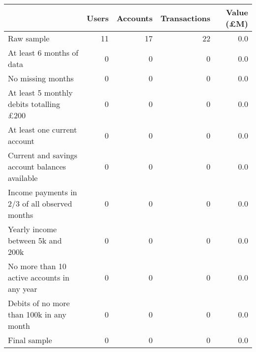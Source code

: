 \begin{tabular}{lrrrr}
\toprule
                                               & Users & Accounts & Transactions & Value (\pounds M) \\
\midrule
                                    Raw sample &    11 &       17 &           22 &               0.0 \\
                     At least 6 months of data &     0 &        0 &            0 &               0.0 \\
                             No missing months &     0 &        0 &            0 &               0.0 \\
At least 5 monthly debits totalling \pounds200 &     0 &        0 &            0 &               0.0 \\
                  At least one current account &     0 &        0 &            0 &               0.0 \\
Current and savings account balances available &     0 &        0 &            0 &               0.0 \\
 Income payments in 2/3 of all observed months &     0 &        0 &            0 &               0.0 \\
             Yearly income between 5k and 200k &     0 &        0 &            0 &               0.0 \\
   No more than 10 active accounts in any year &     0 &        0 &            0 &               0.0 \\
      Debits of no more than 100k in any month &     0 &        0 &            0 &               0.0 \\
                                  Final sample &     0 &        0 &            0 &               0.0 \\
\bottomrule
\end{tabular}
